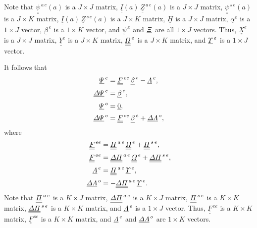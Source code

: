 \documentclass[12pt,prb,aps,notitlepage]{revtex4-1}
\begin{document}
Note that $\underline{\underline{\psi}}^{\,a\,e}(a)$ is a $J\times J$ matrix, $\underline{\underline{I}}(a)\,\underline{\underline{Z}}^{\,a\,e}(a)$  is a $J\times J$ matrix, 
$\underline{\underline{\psi}}^{\,s\,e}(a)$ is a $J\times K$ matrix, $\underline{\underline{I}}(a)\,\underline{\underline{Z}}^{\,s\,e}(a)$  is a $J\times K$ matrix, 
$\underline{\underline{H}}$ is a $J\times J$ matrix, $\underline{\alpha}^e$ is
a $1\times J$ vector,  $\underline{\beta}^{\,e}$ is a $1\times K$ vector, and $\underline{\psi}^{\,x}$ and $\underline{\mit\Xi}$   are all $1\times J$ vectors. Thus, $\underline{\underline{X}}^e$ is a $J\times J$ matrix, $\underline{\underline{Y}}^e$
is a $J\times K$ matrix, $\underline{\underline{\mit\Omega}}^{\,e}$ is a $J\times K$ matrix, and  $\underline{\mit\Upsilon}^{\,e}$ is a $1\times J$ vector. 

It follows that
\begin{align}\label{e25}
\underline{\mit\Psi}^{\,e} &= \underline{\underline{F}}^{\,ee}\,\underline{\beta}^{\,e} - \underline{\mit\Lambda}^{\,e},\\[0.5ex]
\underline{\mit\Delta\Psi}^{\,e} &= \underline{\beta}^{\,e},\\[0.5ex]
\underline{\mit\Psi}^{\,o} &= \underline{0},\\[0.5ex]
\underline{\mit\Delta\Psi}^{\,o} &= \underline{\underline{F}}^{\,oe}\,\underline{\beta}^{\,e} + \underline{\mit\Delta\Lambda}^{\,o},\label{e28}
\end{align}
where
\begin{align}
\underline{\underline{F}}^{\,ee} &= \underline{\underline{\mit\Pi}}^{\,a\,e}\,\underline{\underline{\mit\Omega}}^{\,e} + \underline{\underline{\mit\Pi}}^{\,s\,e},\\[0.5ex]
\underline{\underline{F}}^{\,oe} &= \underline{\underline{\mit\Delta\Pi}}^{\,a\,e}\,\underline{\underline{\mit\Omega}}^{\,e} + \underline{\underline{\mit\Delta\Pi}}^{\,s\,e},\\[0.5ex]
\underline{\mit\Lambda}^{\,e}&= \underline{\underline{\mit\Pi}}^{\,a\,e}\,\underline{\mit\Upsilon}^{\,e},\\[0.5ex]
\underline{\mit\Delta\Lambda}^{\,o}&= -\underline{\underline{\mit\Delta\Pi}}^{\,a\,e}\,\underline{\mit\Upsilon}^{\,e}.
\end{align}
Note that  $\underline{\underline{\mit\Pi}}^{\,a\,e}$ is a $K\times J$ matrix, $\underline{\underline{\mit\Delta\Pi}}^{\,a\,e}$ is a $K\times J$ matrix, 
$\underline{\underline{\mit\Pi}}^{\,s\,e}$ is a $K\times K$ matrix, $\underline{\underline{\mit\Delta\Pi}}^{\,s\,e}$ is a $K\times K$ matrix, and $\underline{\mit\Lambda}^{\,e}$ is
a $1\times J$ vector. 
Thus, $\underline{\underline{F}}^{\,ee}$ is a $K\times K$ matrix, $\underline{\underline{F}}^{\,oe}$ is a $K\times K$ matrix, and $\underline{\mit\Lambda}^{\,e}$ and 
$\underline{\mit\Delta\Lambda}^{\,o}$ are $1\times K$ vectors. 
\end{document}
